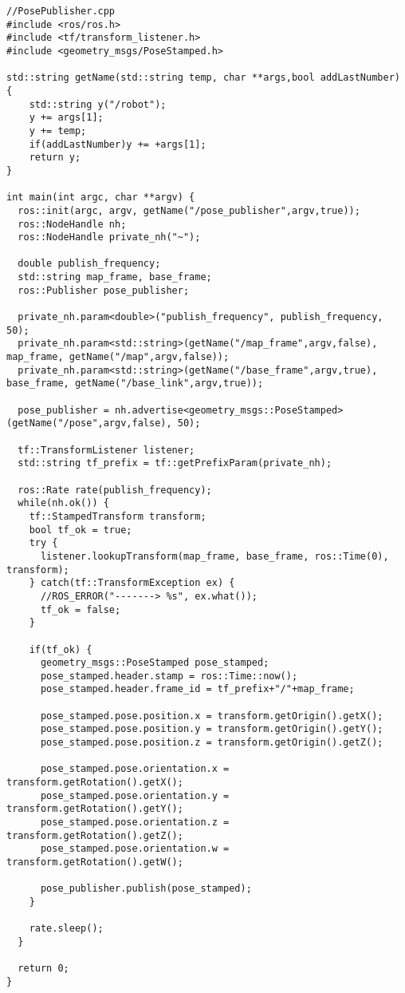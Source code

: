 \begin{lstlisting}
//PosePublisher.cpp
#include <ros/ros.h>
#include <tf/transform_listener.h>
#include <geometry_msgs/PoseStamped.h>

std::string getName(std::string temp, char **args,bool addLastNumber) {
    std::string y("/robot");
    y += args[1];
    y += temp;
    if(addLastNumber)y += +args[1];
    return y;
}

int main(int argc, char **argv) {
  ros::init(argc, argv, getName("/pose_publisher",argv,true));
  ros::NodeHandle nh;
  ros::NodeHandle private_nh("~");
  
  double publish_frequency;
  std::string map_frame, base_frame;
  ros::Publisher pose_publisher;
  
  private_nh.param<double>("publish_frequency", publish_frequency, 50);
  private_nh.param<std::string>(getName("/map_frame",argv,false), map_frame, getName("/map",argv,false));
  private_nh.param<std::string>(getName("/base_frame",argv,true), base_frame, getName("/base_link",argv,true));
  
  pose_publisher = nh.advertise<geometry_msgs::PoseStamped>(getName("/pose",argv,false), 50);
  
  tf::TransformListener listener;
  std::string tf_prefix = tf::getPrefixParam(private_nh);
  
  ros::Rate rate(publish_frequency);
  while(nh.ok()) {
    tf::StampedTransform transform;
    bool tf_ok = true;
    try {
      listener.lookupTransform(map_frame, base_frame, ros::Time(0), transform);
    } catch(tf::TransformException ex) {
      //ROS_ERROR("-------> %s", ex.what());
      tf_ok = false;
    }
    
    if(tf_ok) {
      geometry_msgs::PoseStamped pose_stamped;
      pose_stamped.header.stamp = ros::Time::now();
      pose_stamped.header.frame_id = tf_prefix+"/"+map_frame;
      
      pose_stamped.pose.position.x = transform.getOrigin().getX();
      pose_stamped.pose.position.y = transform.getOrigin().getY();
      pose_stamped.pose.position.z = transform.getOrigin().getZ();
      
      pose_stamped.pose.orientation.x = transform.getRotation().getX();
      pose_stamped.pose.orientation.y = transform.getRotation().getY();
      pose_stamped.pose.orientation.z = transform.getRotation().getZ();
      pose_stamped.pose.orientation.w = transform.getRotation().getW();
      
      pose_publisher.publish(pose_stamped);
    }
    
    rate.sleep();
  }
  
  return 0;
}
\end{lstlisting}
